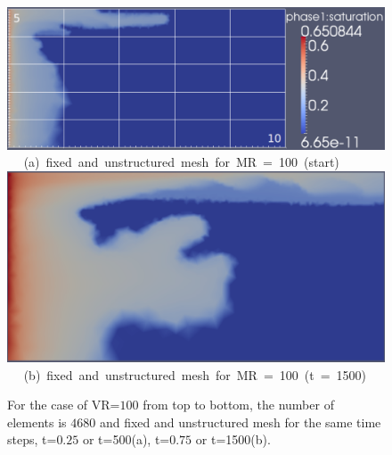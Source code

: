 \begin{landscape}
\begin{figure}[ht] 
\vbox{
\hbox{\hspace{3.5cm}
\includegraphics[width=.8\textwidth]{./Pics1/mr100_fixed/mr100_fixed_500.pdf} 
}
\vspace{0.0cm}
\hbox{\hspace{4.0cm} (a) fixed and unstructured mesh for MR = 100 (start)   
}
\hbox{\hspace{3.5cm}
\includegraphics[width=.8\textwidth]{./Pics1/mr100_fixed/mr100_fixed_1500.pdf}
}
\vspace{0.0cm}
\hbox{\hspace{3.75cm} (b) fixed and unstructured mesh for MR = 100 (t = 1500)   
}
}     
\caption{For the case of VR=$100$ from top to bottom, the number of elements is $4680$ and fixed and unstructured mesh for the same time steps, t=$0.25$ or t=500(a), t=$0.75$ or t=1500(b). }
\label{fig:4testcase_a}
\end{figure}
\end{landscape}
\clearpage

